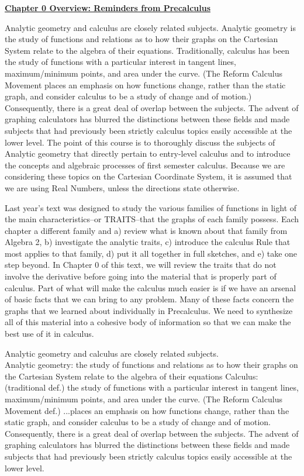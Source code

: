 \textbf{\underline{\large{Chapter 0 Overview: Reminders from Precalculus}}} \par

Analytic geometry and calculus are closely related subjects. Analytic geometry is the study of functions and relations as to how their graphs on the Cartesian System relate to the algebra of their equations. Traditionally, calculus has been the study of functions with a particular interest in tangent lines, maximum/minimum points, and area under the curve. (The Reform Calculus Movement places an emphasis on how functions change, rather than the static graph, and consider calculus to be a study of change and of motion.) Consequently, there is a great deal of overlap between the subjects. The advent of graphing calculators has blurred the distinctions between these fields and made subjects that had previously been strictly calculus topics easily accessible at the lower level. The point of this course is to thoroughly discuss the subjects of Analytic geometry that directly pertain to entry-level calculus and to introduce the concepts and algebraic processes of first semester calculus. Because we are considering these topics on the Cartesian Coordinate System, it is assumed that we are using Real Numbers, unless the directions state otherwise.

Last year’s text was designed to study the various families of functions in light of the main characteristics--or TRAITS--that the graphs of each family possess. Each chapter a different family and a) review what is known about that family from Algebra 2, b) investigate the analytic traits, c) introduce the calculus Rule that most applies to that family, d) put it all together in full sketches, and e) take one step beyond. In Chapter 0 of this text, we will review the traits that do not involve the derivative before going into the material that is properly part of calculus. Part of what will make the calculus much easier is if we have an arsenal of basic facts that we can bring to any problem. Many of these facts concern the graphs that we learned about individually in Precalculus. We need to synthesize all of this material into a cohesive body of information so that we can make the best use of it in calculus.


\pagebreak
\parindent=0pt Analytic geometry and calculus are closely related subjects. \\
\setlength{\parindent}{24pt}    Analytic geometry: the study of functions and relations as to how their graphs on the Cartesian System relate to the algebra of their equations
    Calculus:
        (traditional def.) the study of functions with a particular interest in tangent lines, maximum/minimum points, and area under the curve.
        (The Reform Calculus Movement def.) ...places an emphasis on how functions change, rather than the static graph, and consider calculus to be a study of change and of motion.
Consequently, there is a great deal of overlap between the subjects. The advent of graphing calculators has blurred the distinctions between these fields and made subjects that had previously been strictly calculus topics easily accessible at the lower level. 

